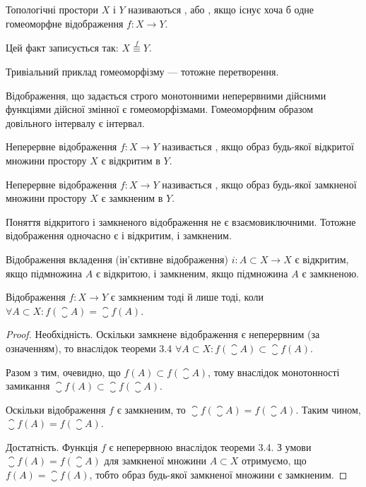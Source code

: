 \begin{definition}
Топологічні простори $X$ і $Y$ називаються
, або , якщо
існує хоча б одне гомеоморфне відображення $f: X \to Y$.
\end{definition}

Цей факт записується так: $X \overset{f}{\equiv} Y$.

\begin{example}
Тривіальний приклад гомеоморфізму --- тотожне перетворення.
\end{example}

\begin{example}
Відображення, що задається строго монотонними неперервними дійсними функціями дійсної
змінної є гомеоморфізмами. Гомеоморфним образом довільного інтервалу є інтервал.
\end{example}

\begin{definition}
Неперервне відображення $f: X \to Y$
називається , якщо образ будь-якої відкритої
множини простору $X$ є відкритим в $Y$.
\end{definition}

\begin{definition}
Неперервне відображення $f: X \to Y$
називається , якщо образ будь-якої замкненої
множини простору $X$ є замкненим в $Y$.
\end{definition}

\begin{remark}
Поняття відкритого і замкненого відображення не є
взаємовиключними. Тотожне відображення одночасно є і
відкритим, і замкненим.
\end{remark}

\begin{example}
Відображення вкладення (ін'єктивне
відображення) $i: A \subset X \to X$ є відкритим, якщо
підмножина $A$ є відкритою, і замкненим, якщо підмножина
$A$ є замкненою.
\end{example}

\begin{theorem}
Відображення $f: X \to Y$ є замкненим тоді
й лише тоді, коли $\forall A \subset X: f(\closure{A}) = \closure{f(A)}$.
\end{theorem}

\begin{proof}
Необхідність. Оскільки замкнене
відображення є неперервним (за означенням), то внаслідок
теореми 3.4 $\forall A \subset X: f(\closure{A}) \subset \closure{f(A)}$.

Разом з тим, очевидно, що $f(A) \subset f(\closure{A})$, тому внаслідок
монотонності замикання $\closure{f(A)} \subset \closure{f(\closure{A})}$.

Оскільки відображення $f$ є замкненим, то
$\closure{f(\closure{A})} = f(\closure{A})$. Таким чином,
$\closure{f(A)} = f(\closure{A})$.

Достатність. Функція $f$ є неперервною внаслідок
теореми 3.4. З умови $\closure{f(A)} = f(\closure{A})$ для замкненої множини
$A \subset X$ отримуємо, що $f(A) = \closure{f(A)}$, тобто образ будь-якої
замкненої множини є замкненим.
\end{proof}

